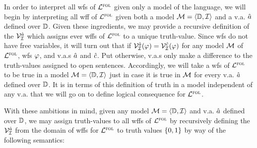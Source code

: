 In order to interpret all wfs of $\mathcal{L}^{\textsc{fol}}$ given only a model of the language, we will begin by interpreting all wff of $\mathcal{L}^{\textsc{fol}}$ given both a model $\mathcal{M} = \langle\mathbb{D}, \mathcal{I}\rangle$ and a v.a. $\hat{a}$ defined over $\mathbb{D}$. 
Given these ingredients, we may provide a recursive definition of the  $\mathcal{V}_{\mathcal{I}}^{\hat{a}}$ which assigns ever wffs of $\mathcal{L}^{\textsc{fol}}$ to a unique truth-value. 
Since wfs do not have free variables, it will turn out that if $\mathcal{V}_{\mathcal{I}}^{\hat{a}}(\varphi) = \mathcal{V}_{\mathcal{I}}^{\hat{c}}(\varphi)$ for any model $\mathcal{M}$ of $\mathcal{L}^{\textsc{fol}}$, wfs $\varphi$, and v.a.s $\hat{a}$ and $\hat{c}$.
Put otherwise, v.a.s only make a difference to the truth-values assigned to open sentences.
Accordingly, we will take a wfs of $\mathcal{L}^{\textsc{fol}}$ to be true in a model $\mathcal{M} = \langle\mathbb{D}, \mathcal{I}\rangle$ just in case it is true in $\mathcal{M}$ for every v.a. $\hat{a}$ defined over $\mathbb{D}$.
It is in terms of this definition of truth in a model independent of any v.a. that we will go on to define logical consequence for $\mathcal{L}^{\textsc{fol}}$.

With these ambitions in mind, given any model $\mathcal{M} = \langle\mathbb{D}, \mathcal{I}\rangle$ and v.a. $\hat{a}$ defined over $\mathbb{D}$, we may assign truth-values to all wffs of $\mathcal{L}^{\textsc{fol}}$ by recursively defining the  $\mathcal{V}_{\mathcal{I}}^{\hat{a}}$ from the domain of wffs for $\mathcal{L}^{\textsc{fol}}$ to truth values $\lbrace0,1\rbrace$ by way of the following semantics: %


